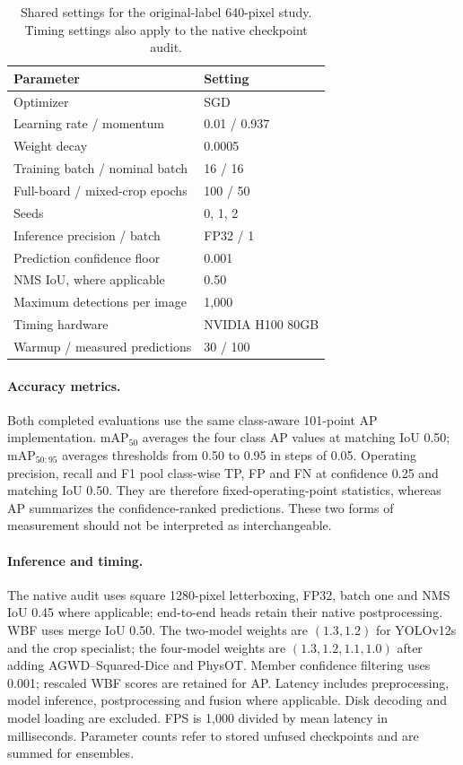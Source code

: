 \begin{table}[!t]
\centering\caption{Shared settings for the original-label 640-pixel study. Timing settings also apply to the native checkpoint audit.}
\label{tab:settings}\small\setlength{\tabcolsep}{4pt}
\begin{tabular}{ll}\toprule
Parameter & Setting\\\midrule
Optimizer & SGD\\
Learning rate / momentum & 0.01 / 0.937\\
Weight decay & 0.0005\\
Training batch / nominal batch & 16 / 16\\
Full-board / mixed-crop epochs & 100 / 50\\
Seeds & 0, 1, 2\\
Inference precision / batch & FP32 / 1\\
Prediction confidence floor & 0.001\\
NMS IoU, where applicable & 0.50\\
Maximum detections per image & 1,000\\
Timing hardware & NVIDIA H100 80GB\\
Warmup / measured predictions & 30 / 100\\\bottomrule
\end{tabular}\end{table}

\paragraph{Accuracy metrics.}
Both completed evaluations use the same class-aware 101-point AP implementation.
$\mathrm{mAP}_{50}$ averages the four class AP values at matching IoU 0.50;
$\mathrm{mAP}_{50:95}$ averages thresholds from 0.50 to 0.95 in steps of 0.05.
Operating precision, recall and F1 pool class-wise TP, FP and FN at confidence
0.25 and matching IoU 0.50. They are therefore fixed-operating-point statistics,
whereas AP summarizes the confidence-ranked predictions. These two forms of
measurement should not be interpreted as interchangeable.

\paragraph{Inference and timing.}
The native audit uses square 1280-pixel letterboxing, FP32, batch one and NMS
IoU 0.45 where applicable; end-to-end heads retain their native postprocessing.
WBF uses merge IoU 0.50. The two-model weights are $(1.3,1.2)$ for YOLOv12s and
the crop specialist; the four-model weights are $(1.3,1.2,1.1,1.0)$ after adding
AGWD--Squared-Dice and PhysOT. Member confidence filtering uses 0.001; rescaled
WBF scores are retained for AP. Latency includes preprocessing, model inference,
postprocessing and fusion where applicable. Disk decoding and model loading are
excluded. FPS is 1,000 divided by mean latency in milliseconds. Parameter counts
refer to stored unfused checkpoints and are summed for ensembles.

